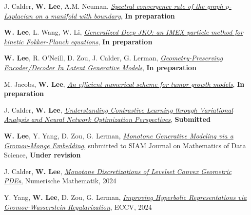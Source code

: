 

\begin{cvparagraph}

\vspace{0.5cm}
\begin{cvitems}
  \item J. Calder, \textbf{W. Lee}, A.M. Neuman, \href{}{\textit{Spectral convergence rate of the graph $p$-Laplacian on a manifold with boundary}}, \textbf{In preparation}
    \medskip
  \item \textbf{W. Lee}, L. Wang, W. Li, \href{}{\textit{Generalized Deep JKO: an IMEX particle method for kinetic Fokker-Planck equations}}, \textbf{In preparation}
  \medskip
  \item \textbf{W. Lee}, R. O'Neill, D. Zou, J. Calder, G. Lerman, \href{}{\textit{Geometry-Preserving Encoder/Decoder In Latent Generative Models}}, \textbf{In preparation}
  \medskip
  \item M. Jacobs, \textbf{W. Lee}, \href{}{\textit{An efficient numerical scheme for tumor growth models}}, \textbf{In preparation}
    \medskip
  \item J. Calder, \textbf{W. Lee}, \href{}{\textit{Understanding Contrastive Learning through Variational Analysis and Neural Network Optimization Perspectives}}, \textbf{Submitted}
    \medskip
  \item \textbf{W. Lee}, Y. Yang, D. Zou, G. Lerman, \href{https://arxiv.org/abs/2311.01375}{\textit{Monotone Generative Modeling via a Gromov-Monge Embedding}}, submitted to SIAM Journal on Mathematics of Data Science, {\bf Under revision}
    \medskip
  \item J. Calder, \textbf{W. Lee}, \href{https://rdcu.be/dZfbw}{\textit{Monotone Discretizations of Levelset Convex Geometric PDEs}}, Numerische Mathematik, 2024
    \medskip
  \item Y. Yang, \textbf{W. Lee}, D. Zou, G. Lerman, \href{http://arxiv.org/abs/2407.10495}{\textit{Improving Hyperbolic Representations via Gromov-Wasserstein Regularization}}, ECCV, 2024

\end{cvitems}
\end{cvparagraph}
